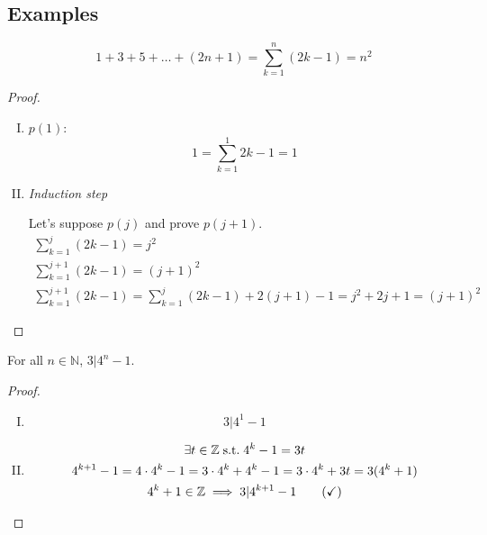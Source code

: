 \documentclass[00_complete]{subfiles}
\begin{document}
\subsection{Examples}
\setcounter{example}{0}
\begin{example}
    $$1+3+5+\dots+(2n+1)= \sum_{k=1}^{n}(2k-1)=n^2$$
\begin{proof}
    \begin{enumerate}[I.]
        \item $p(1)$:
        \begin{equation}
        1= \sum_{k=1}^{1}2k-1 =1 \tag{\checkmark}
        \end{equation}
        \item \emph{Induction step}

        Let's suppose $p(j)$ and prove $p(j+1)$.
        \begin{gather*}
            \sum_{k=1}^j(2k-1)=j^2 \\
            \sum_{k=1}^{j+1}(2k-1)=(j+1)^2 \\
            \sum_{k=1}^{j+1}(2k-1) = \sum_{k=1}^j(2k-1)+2(j+1)-1 = j^2+2j+1 =
            (j+1)^2 \tag{\checkmark}
        \end{gather*}
    \end{enumerate}
\end{proof}
\end{example}
\begin{example}
    For all $n \in \mathbb{N}$, $3|4^n-1$.
    \begin{proof}
    \begin{enumerate}[I.]
        \item
            \begin{equation}
                3|4^1-1 \tag{\checkmark}
            \end{equation}
        \item
            \begin{gather*}
                \exists t \in \mathbb{Z} \;\mathrm{s.t.}\; 4^k-1=3t \\
                4^{k+1}-1=4\cdot 4^k-1 = 3\cdot 4^k + 4^k-1=3\cdot
                4^k+3t=3(4^k+1) \\
                4^k+1 \in \mathbb{Z} \implies 3|4^{k+1}-1\tag{\checkmark}
            \end{gather*}
    \end{enumerate}
    \end{proof}
\end{example}
\end{document}

